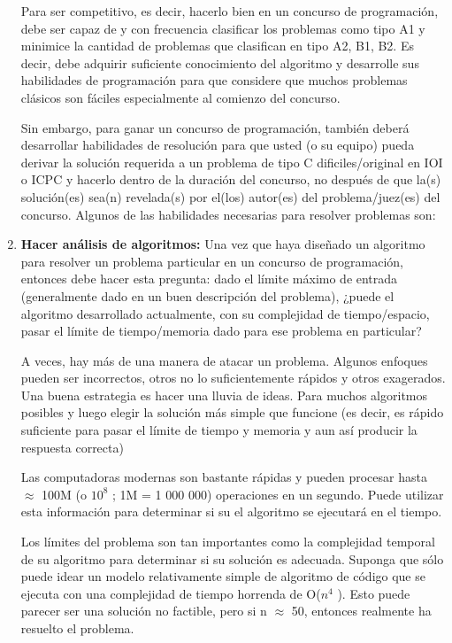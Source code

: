 \begin{enumerate}
	Para ser competitivo, es decir, hacerlo bien en un concurso de programación, debe ser capaz de
	y con frecuencia clasificar los problemas como tipo A1 y minimice la cantidad de problemas que
	clasifican en tipo A2, B1, B2. Es decir, debe adquirir suficiente conocimiento del algoritmo y
	desarrolle sus habilidades de programación para que considere que muchos problemas clásicos son fáciles especialmente al comienzo del concurso.
	
	Sin embargo, para ganar un concurso de programación, también deberá desarrollar habilidades de resolución para que usted (o su equipo) pueda derivar la solución requerida a un
	problema de tipo C dificiles/original en IOI o ICPC y hacerlo dentro de la duración del concurso,
	no después de que la(s) solución(es) sea(n) revelada(s) por el(los) autor(es) del problema/juez(es) del concurso. Algunos de las habilidades necesarias para resolver problemas son:
	
	
	
	\item \textbf{Hacer análisis de algoritmos:} Una vez que haya diseñado un algoritmo para resolver un problema particular en un concurso de programación, entonces debe hacer esta pregunta: dado el límite máximo de entrada (generalmente dado en un buen descripción del problema), ¿puede el algoritmo desarrollado actualmente, con su complejidad de tiempo/espacio, pasar el límite de tiempo/memoria dado para ese problema en particular?
	
	A veces, hay más de una manera de atacar un problema. Algunos enfoques pueden ser
	incorrectos, otros no lo suficientemente rápidos y otros exagerados. Una buena estrategia es hacer una lluvia de ideas. Para muchos algoritmos posibles y luego elegir la solución más simple que funcione (es decir, es rápido suficiente para pasar el límite de tiempo y memoria y aun así producir la respuesta correcta)
	
	Las computadoras modernas son bastante rápidas y pueden procesar hasta $\approx$ 100M (o $10^{8}$ ; 1M = 1 000 000) operaciones en un segundo. Puede utilizar esta información para determinar si su
	el algoritmo se ejecutará en el tiempo. 
	
	Los límites del problema son tan importantes como la complejidad temporal de su algoritmo para determinar si su solución es adecuada. Suponga que sólo puede idear un modelo relativamente simple de algoritmo de código que se ejecuta con una complejidad de tiempo horrenda de O($n^{4}$ ). Esto puede parecer ser una solución no factible, pero si n $\approx$ 50, entonces realmente ha resuelto el problema.
	

\end{enumerate}
